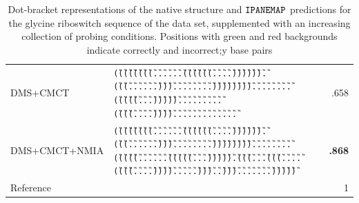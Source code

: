 \documentclass[a4,center,fleqn]{NAR}
\newcommand{\Software}[1]{$\text{\ttfamily #1}$}
\newcommand{\OurTool}{\Software{IPANEMAP}\xspace}
\begin{document}
\begin{table}
\begin{adjustbox}{max width=\linewidth}
\begin{tabular}{@{}llr@{}}
			DMS+CMCT & {\tt \G{(}\G{(}\G{(}\G{(}\G{(}\G{(}\G{(}\G{(}\G{.}\G{.}\G{.}\G{.}\G{.}\G{.}\G{(}\G{(}\G{(}\G{(}\G{(}\G{(}\G{.}\G{.}\G{.}\G{.}\G{)}\G{)}\G{)}\G{)}\G{)}\G{)}\G{.}\G{(}\G{(}\G{(}\B{(}\B{(}\B{(}\B{(}\B{(}\B{.}\B{.}\G{.}\G{.}\G{.}\G{.}\B{)}\B{)}\B{)}\B{)}\B{)}\G{.}\G{.}\G{)}\G{)}\G{)}\G{.}\G{.}\G{.}\G{.}\G{.}\G{.}\G{.}\G{.}\G{)}\G{)}\G{)}\G{)}\G{)}\G{)}\G{)}\G{)}\G{.}\G{.}\G{.}\G{.}\G{.}\G{.}\G{.}\B{(}\B{(}\B{.}\B{.}\B{.}\B{.}\B{(}\B{(}\B{(}\B{(}\B{(}\G{.}\G{(}\G{(}\G{(}\G{(}\G{(}\B{(}\G{.}\G{.}\G{.}\B{)}\G{)}\G{)}\G{)}\G{)}\G{)}\G{.}\B{.}\B{.}\B{.}\G{.}\G{.}\G{.}\G{.}\B{.}\B{.}\B{.}\G{.}\G{.}\G{.}\G{.}\G{(}\G{(}\G{(}\G{(}\G{.}\G{.}\G{.}\G{.}\G{)}\G{)}\G{)}\G{)}\G{.}\G{.}\G{.}\G{.}\G{.}\B{)}\B{)}\B{)}\B{)}\B{)}\G{.}\B{)}\B{)}\B{.}\G{.}\G{.}\G{.}\G{.}\G{.}\G{.}\G{.}\B{.}\B{.}\B{.}\B{.}\B{.}}&.658\\
			DMS+CMCT+NMIA & {\tt \G{(}\G{(}\G{(}\G{(}\G{(}\G{(}\G{(}\G{(}\G{.}\G{.}\G{.}\G{.}\G{.}\G{.}\G{(}\G{(}\G{(}\G{(}\G{(}\G{(}\G{.}\G{.}\G{.}\G{.}\G{)}\G{)}\G{)}\G{)}\G{)}\G{)}\G{.}\G{(}\G{(}\G{(}\B{(}\B{(}\B{(}\B{(}\B{(}\B{.}\B{.}\G{.}\G{.}\G{.}\G{.}\B{)}\B{)}\B{)}\B{)}\B{)}\G{.}\G{.}\G{)}\G{)}\G{)}\G{.}\G{.}\G{.}\G{.}\G{.}\G{.}\G{.}\G{.}\G{)}\G{)}\G{)}\G{)}\G{)}\G{)}\G{)}\G{)}\G{.}\G{.}\G{.}\G{.}\G{.}\G{.}\G{.}\G{.}\G{(}\G{(}\G{(}\G{(}\G{(}\G{.}\G{.}\G{.}\G{.}\G{.}\G{.}\G{(}\G{(}\G{(}\G{(}\G{(}\B{(}\G{.}\G{.}\G{.}\B{)}\G{)}\G{)}\G{)}\G{)}\G{)}\G{.}\G{(}\G{(}\G{(}\G{.}\G{.}\G{.}\B{(}\G{(}\G{(}\G{(}\G{.}\G{.}\G{.}\G{.}\G{(}\G{(}\G{(}\G{(}\G{.}\G{.}\G{.}\G{.}\G{)}\G{)}\G{)}\G{)}\G{.}\G{.}\G{.}\G{.}\G{.}\G{)}\G{)}\G{)}\B{)}\G{.}\G{.}\G{)}\G{)}\G{)}\G{.}\G{.}\G{.}\G{.}\G{.}\G{.}\G{.}\G{)}\G{)}\G{)}\G{)}\G{)}} & \textbf{.868}\\ \midrule
			Reference& {\tt \Base{((((((((......((((((....)))))).(((....(((.....)))...)))........))))))))........(((((......(((((.....))))).(((....(((....((((....)))).....)))...))).......)))))}}& 1\\
			\bottomrule
		\end{tabular}
	\end{adjustbox}\\
	\caption{Dot-bracket representations of the native structure and \OurTool predictions for the glycine riboswitch sequence of the \citet{Cordero2012} data set, supplemented with an increasing collection of probing conditions. Positions with green and red backgrounds indicate correctly and incorrect;y base pairs }\label{fig:glycine_example}
\end{table}
\end{document}
